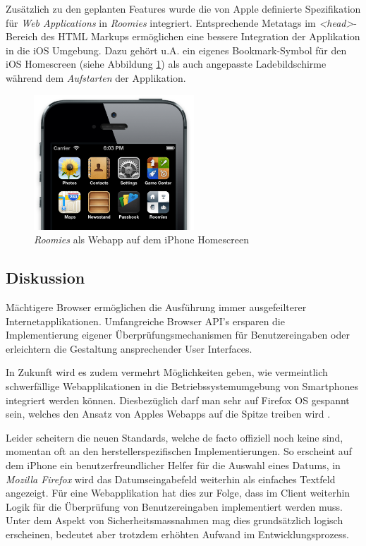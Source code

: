 Zusätzlich zu den geplanten Features wurde die von Apple definierte Spezifikation für \emph{Web Applications} \cite{SafariWebApp} in \emph{Roomies} integriert. Entsprechende Metatags im \emph{<head>}-Bereich des HTML Markups ermöglichen eine bessere Integration der Applikation in die iOS Umgebung. Dazu gehört u.A. ein eigenes Bookmark-Symbol für den iOS Homescreen (siehe Abbildung \ref{fig:webapp-homescreen-icon}) als auch angepasste Ladebildschirme während dem \emph{Aufstarten} der Applikation.

\begin{figure}[H]
	\centering
	\includegraphics[width=6cm]{content/principle-demonstration/images/ios-webapp-homescreenicon.png}
	\caption{\emph{Roomies} als Webapp auf dem iPhone Homescreen}
	\label{fig:webapp-homescreen-icon}
\end{figure}


\subsection*{Diskussion}

Mächtigere Browser ermöglichen die Ausführung immer ausgefeilterer Internetapplikationen. Umfangreiche Browser API's ersparen die Implementierung eigener Überprüfungsmechanismen für Benutzereingaben oder erleichtern die Gestaltung ansprechender User Interfaces.

In Zukunft wird es zudem vermehrt Möglichkeiten geben, wie vermeintlich schwerfällige Webapplikationen in die Betriebssystemumgebung von Smartphones integriert werden können. Diesbezüglich darf man sehr auf Firefox OS gespannt sein, welches den Ansatz von Apples Webapps auf die Spitze treiben wird \cite{FirefoxOSWebApp}.

Leider scheitern die neuen Standards, welche de facto offiziell noch keine sind, momentan oft an den herstellerspezifischen Implementierungen. So erscheint auf dem iPhone ein benutzerfreundlicher Helfer für die Auswahl eines Datums, in \emph{Mozilla Firefox} \cite{CanIUseDateInput} wird das Datumseingabefeld weiterhin als einfaches Textfeld angezeigt. Für eine Webapplikation hat dies zur Folge, dass im Client weiterhin Logik für die Überprüfung von Benutzereingaben implementiert werden muss. Unter dem Aspekt von Sicherheitsmassnahmen mag dies grundsätzlich logisch erscheinen, bedeutet aber trotzdem erhöhten Aufwand im Entwicklungsprozess.


